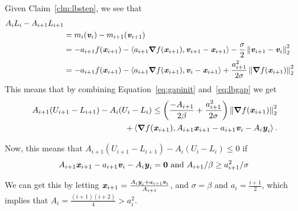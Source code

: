 Given Claim~\ref{clm:lbstep}, we see that
\begin{align}
  \nonumber
 A_iL_i-A_{i+1}L_{i+1}
\\
 &= m_{i}(\boldsymbol{\mathit{v}}_i)  - m_{i+1}(\boldsymbol{\mathit{v}}_{i+1})
 \\
 &=
-  a_{i+1}  f(\boldsymbol{\mathit{x}}_{i+1})
-  \left<  a_{i+1}\boldsymbol{\nabla}
  f(\boldsymbol{\mathit{x}}_{i+1}) ,\boldsymbol{\mathit{v}}_{i+1} - \boldsymbol{\mathit{x}}_{i+1} \right>
-
\frac{\sigma}{2} \left\|  \boldsymbol{\mathit{v}}_{i+1} -
   \boldsymbol{\mathit{v}}_i \right\|_2^2
\\
 &=
 -  a_{i+1}  f(\boldsymbol{\mathit{x}}_{i+1})
-  \left<  a_{i+1}\boldsymbol{\nabla} f(\boldsymbol{\mathit{x}}_{i+1}) ,\boldsymbol{\mathit{v}}_{i} - \boldsymbol{\mathit{x}}_{i+1} \right>
+
   \frac{a_{i+1}^2}{2\sigma} \left\|  \boldsymbol{\nabla} f(\boldsymbol{\mathit{x}}_{i+1}) \right\|_2^2
   \label{eq:lbgap}
\end{align}
This means that by combining Equation~\eqref{eq:gapinit}
and~\eqref{eq:lbgap} we get
\begin{align*}
  \
  A_{i+1}( U_{i+1} - L_{i+1})
 -
  A_{i}( U_{i} - L_{i})
  \leq
  \left(
  \frac{-A_{i+1}}{2\beta}
  +
\frac{a_{i+1}^2}{2\sigma}
  \right)
  \left\|  \boldsymbol{\nabla} f(\boldsymbol{\mathit{x}}_{i+1}) \right\|_2^2
  \\
  +  \left< \boldsymbol{\nabla} f(\boldsymbol{\mathit{x}}_{i+1}) ,
  A_{i+1} \boldsymbol{\mathit{x}}_{i+1}
  - a_{i+1} \boldsymbol{\mathit{v}}_{i}
  - A_{i} \boldsymbol{\mathit{y}}_{i} \right>
  .
\end{align*}

Now, this means that $ A_{i+1}( U_{i+1} - L_{i+1}) - A_{i}( U_{i} -
L_{i}) \leq 0$ if
\[
   A_{i+1} \boldsymbol{\mathit{x}}_{i+1}
  - a_{i+1} \boldsymbol{\mathit{v}}_{i}
  - A_{i} \boldsymbol{\mathit{y}}_{i} = \boldsymbol{0}
\text{ and }
A_{i+1}/\beta \geq  a_{i+1}^2/\sigma
\]

We can get this by letting
$\boldsymbol{\mathit{x}}_{i+1} = \frac{
A_{i} \boldsymbol{\mathit{y}}_{i} + a_{i+1} \boldsymbol{\mathit{v}}_{i}
}{A_{i+1}}
$, and $\sigma = \beta$ and $a_i = \frac{i+1}{2}$,
which implies that $A_i = \frac{(i+1)(i+2)}{4} > a_i^2$.



